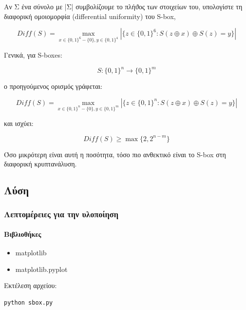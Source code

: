 \documentclass[oneside]{article}
\let\t\texttt
\begin{document}
Αν Σ ένα σύνολο με |Σ| συμβολίζουμε το πλήϑος των στοιχείων του, υπολογίστε τη διαφορική ομοιομορφία (differential uniformity) του S-box,

\begin{equation} \label{eq:811}
     Diff(S) = \max_{x \in \{0,1\}^6 - \{0\}, y\in \{0,1\}^4} |\{z \in \{0,1\}^6 : S(z \oplus x) \oplus S(z) = y\}|
\end{equation}

Γενικά, για S-boxes:

\begin{equation}
    S : \{0, 1\}^n \rightarrow \{0, 1\}^m
\end{equation}

ο προηγούμενος ορισμός γράφεται:

\begin{equation}
     Diff(S) = \max_{x \in \{0,1\}^n - \{0\}, y\in \{0,1\}^m} |\{z \in \{0,1\}^n : S(z \oplus x) \oplus S(z) = y\}|
\end{equation}

και ισχύει:

\begin{equation}\label{eq:813}
    Diff(S) \ge \max \{2, 2^{n-m}\}
\end{equation}

Όσο μικρότερη είναι αυτή η ποσότητα, τόσο πιο ανθεκτικό είναι το S-box στη διαφορική κρυπτανάλυση.

\subsection{Λύση} 

\subsubsection{Λεπτομέρειες για την υλοποίηση}

\paragraph{Βιβλιοθήκες}

\begin{itemize}
    \item matplotlib
    \item matplotlib.pyplot
\end{itemize}

Εκτέλεση αρχείου:

\begin{center}
    \t{python sbox.py}
\end{center}
\end{document}
